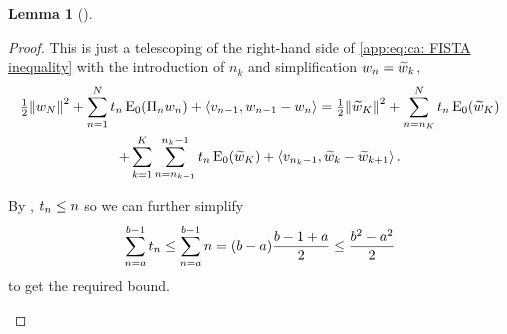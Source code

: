 \documentclass[10pt,a4paper,onecolumn]{article}
\numberwithin{equation}{section}
\newtheorem{lemma}{Lemma}[section]\newtheorem{example}{Example}[section]
\newcommand{\norm}[1]{{\left\lVert #1 \right\rVert}}
\newcommand{\IP}[2]{\left\langle #1,#2 \right\rangle}\newcommand{\ip}[2]{#1 \vcenter{\hbox{\resizebox{6pt}{!}{\ensuremath\cdot}}} #2}
\newcommand{\op}[1]{\operatorname{#1}}\newcommand{\overtext}[2]{\stackrel{\text{#1}}{#2}}
\newcommand*{\Func}[1]{%
	\IfEqCase{#1}{%
		{0}{\op{E}}%
		{1}{\op{F}}%
		{2}{\op{G}}%
		{3}{\op{H}}%
	}[\op{F}#1]%
}
\newcommand*{\varf}[1]{%
	\IfEqCase{#1}{%
		{0}{u}%
		{1}{v}%
		{2}{w}%
	}[u#1]%
}
\newcommand*{\vart}[1]{%
	\IfEqCase{#1}{%
		{0}{s}%
		{1}{t}%
	}[t#1]%
}
\newcommand*{\vars}[1]{%
	\IfEqCase{#1}{%
		{0}{\alpha}%
		{1}{\beta}%
		{2}{\gamma}%
		{3}{a}%
		{4}{b}%
		{5}{c}%
	}[k#1]%
}
\begin{document}
\begin{lemma}[]\label{app:thm:ca: mini exponential FISTA convergence}
\end{lemma}
\begin{proof}
	This is just a telescoping of the right-hand side of \eqref{app:eq:ca: FISTA inequality} with the introduction of $n_k$ and simplification $\varf2_n = \tilde{\varf2}_k$,
	\begin{multline*}
		\tfrac12\norm{\varf2_N}^2 + \sum^N_{n=1} \vart1_n\Func0_0(\Pi_n\varf2_n) + \IP{\varf1_{n-1}}{\varf2_{n-1}-\varf2_n} = \tfrac12\norm{\tilde{\varf2}_K}^2 + \sum_{n=n_K}^N\vart1_n\Func0_0(\tilde{\varf2}_K) 
		\\+ \sum_{k=1}^K\sum_{n=n_{k-1}}^{n_k-1}\vart1_n\Func0_0(\tilde{\varf2}_K) 
		+ \IP{\varf1_{n_k-1}}{\tilde{\varf2}_k-\tilde{\varf2}_{k+1}}.
	\end{multline*}
	\begin{samepage}
		By , $\vart1_n\leq n$ so we can further simplify
		$$\sum_{n=\vars3}^{\vars4-1}\vart1_n \leq \sum_{n=\vars3}^{\vars4-1}n = (\vars4-\vars3)\frac{\vars4-1+\vars3}{2} \leq \frac{\vars4^2-\vars3^2}{2}$$
		to get the required bound.
	\end{samepage}
\end{proof}
\end{document}
